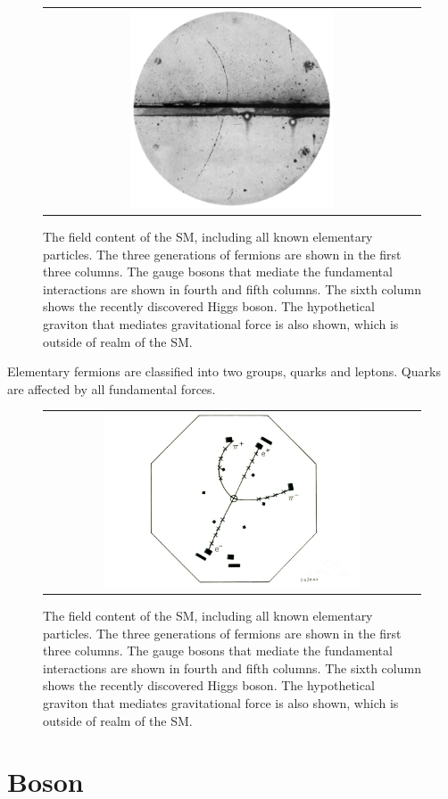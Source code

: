 \begin{figure}[tbh!]
 \begin{center}
 \begin{tabular}{c}
 \includegraphics[width=0.55\textwidth]{figures/Part1/Field/Positron}
 \end{tabular}
 \caption{The field content of the \ac{SM}, including all known elementary particles. The three generations of fermions are shown in the first three columns. The gauge bosons that mediate the fundamental interactions are shown in fourth and fifth columns. The sixth column shows the recently discovered Higgs boson. The hypothetical graviton that mediates gravitational force is also shown, which is outside of realm of the \ac{SM}.~\cite{tikz:SM}}
 \label{fig:Positron}
 \end{center}
\end{figure}

Elementary fermions are classified into two groups, quarks and leptons. Quarks are affected by all fundamental forces. 

\begin{figure}[tbh!]
 \begin{center}
 \begin{tabular}{c}
 \includegraphics[width=0.7\textwidth]{figures/Part1/Field/J}
 \end{tabular}
 \caption{The field content of the \ac{SM}, including all known elementary particles. The three generations of fermions are shown in the first three columns. The gauge bosons that mediate the fundamental interactions are shown in fourth and fifth columns. The sixth column shows the recently discovered Higgs boson. The hypothetical graviton that mediates gravitational force is also shown, which is outside of realm of the \ac{SM}.~\cite{tikz:SM}}
 \label{fig:JPsi}
 \end{center}
\end{figure}

\section{Boson}
\label{sec:Boson}